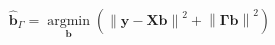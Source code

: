 \documentclass[10pt]{article}
\begin{document}
\begin{align*}\boldsymbol{\hat{b}}_\Gamma = \operatorname*{argmin}_{\boldsymbol b} \left( \left\lVert \boldsymbol y - \boldsymbol X \boldsymbol b \right\rVert^2 + \left\lVert \boldsymbol \Gamma \boldsymbol b \right\rVert^2 \right)\end{align*}
\end{document}
